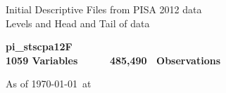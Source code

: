 \documentclass[11pt,landscape]{article}
\begin{document}
 
\setlength{\LTleft}{0pt plus 1fill minus 1fill}
\setlength{\LTright}{\LTleft}
\noindent
\setlength\tabcolsep{10pt} 
\def\arraystretch{1.5}
\small

\begingroup  
  \centering
  \LARGE Initial Descriptive Files from PISA 2012 data \\[1.5em]
  \Large Levels and Head and Tail of data  \\[1em]
\endgroup

\begin{center}\textbf{pi\_stscpa12F \\ 1059 Variables~~~~~ 485,490 ~Observations}
\\   \end{center}

\begin{center}\textnormal{ As of \today \ at \ \currenttime }
\end{center}
\end{document}

